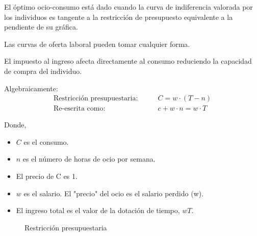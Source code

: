 \documentclass{templateNote}
\begin{document}
\begin{itemize}
    El óptimo ocio-consumo está dado cuando la curva de indiferencia valorada por los individuos
    es tangente a la restricción de presupuesto equivalente a la pendiente de su gráfica.

    Las curvas de oferta laboral pueden tomar cualquier forma.

    El impuesto al ingreso afecta directamente al consumo reduciendo la capacidad de compra del
    individuo.

    \newpage
    Algebraicamente:
    \begin{align*}
        \text{Restricción presupuestaria:} \qquad & C = w \cdot (T - n) \\
        \text{Re-escrita como:} \qquad & c + w \cdot n = w \cdot T
    \end{align*}
    
    Donde,
    \begin{itemize}
        \item $C$ es el consumo.
        \item $n$ es el número de horas de ocio por semana.
        \item El precio de C es 1.
        \item $w$ es el salario. El "precio" del ocio es el salario perdido (w).
        \item El ingreso total es el valor de la dotación de tiempo, $wT$.
    \end{itemize}

    \begin{figure}[H]
        \centering
        \caption{Restricción presupuestaria}


\end{figure}
\end{itemize}
\end{document}
